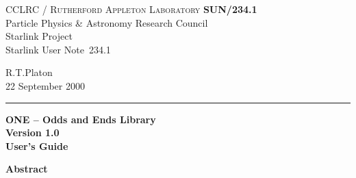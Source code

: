 \documentclass[twoside,11pt]{article}
\newcommand{\stardoccategory}  {Starlink User Note}
\newcommand{\stardocinitials}  {SUN}
\newcommand{\stardocnumber}    {234.1}
\newcommand{\stardocauthors}   {R.T.Platon}
\newcommand{\stardocdate}      {22 September 2000}
\newcommand{\stardoctitle}     {ONE -- Odds and Ends Library}
\newcommand{\stardocversion}   {Version 1.0}
\newcommand{\stardocmanual}    {User's Guide}
\newcommand{\stardocname}{\stardocinitials /\stardocnumber}
\newenvironment{latexonly}{}{}
\renewcommand{\_}{\texttt{\symbol{95}}}
\begin{document}
\thispagestyle{empty}

\begin{latexonly}
   CCLRC / \textsc{Rutherford Appleton Laboratory} \hfill \textbf{\stardocname}\\
   {\large Particle Physics \& Astronomy Research Council}\\
   {\large Starlink Project\\}
   {\large \stardoccategory\ \stardocnumber}
   \begin{flushright}
   \stardocauthors\\
   \stardocdate
   \end{flushright}
   \vspace{-4mm}
   \rule{\textwidth}{0.5mm}
   \vspace{5mm}
   \begin{center}
   {\Huge\textbf{\stardoctitle \\ [2.5ex]}}
   {\LARGE\textbf{\stardocversion \\ [4ex]}}
   {\Huge\textbf{\stardocmanual}}
   \end{center}
   \vspace{5mm}


   \vspace{10mm}
   \begin{center}
      {\Large\textbf{Abstract}}
   \end{center}
\end{latexonly}
\end{document}
